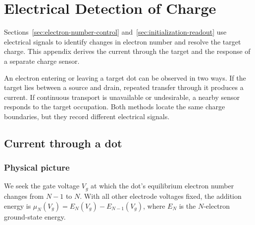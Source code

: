 \FloatBarrier
\section{Electrical Detection of Charge}
\label{app:charge-detection}

Sections~\ref{sec:electron-number-control}
and~\ref{sec:initialization-readout} use electrical signals to identify
changes in electron number and resolve the target charge. This appendix
derives the current through the target and the response of a separate
charge sensor.
\label{chap:experimental-measurement}

An electron entering or leaving a target dot can be observed in two
ways. If the target lies between a source and drain, repeated transfer
through it produces a current. If continuous transport is unavailable
or undesirable, a nearby sensor responds to the target occupation.
Both methods locate the same charge boundaries, but they record
different electrical signals.

\subsection{Current through a dot}
\label{sec:measurement-sequential-tunneling}

\subsubsection{Physical picture}
\label{sec:measurement-current-picture}

We seek the gate voltage $V_g$ at which the dot's equilibrium
electron number changes from $N-1$ to $N$. With all other electrode
voltages fixed, the addition energy is
$\mu_N(V_g)=E_N(V_g)-E_{N-1}(V_g)$, where $E_N$ is the
$N$-electron ground-state energy.

